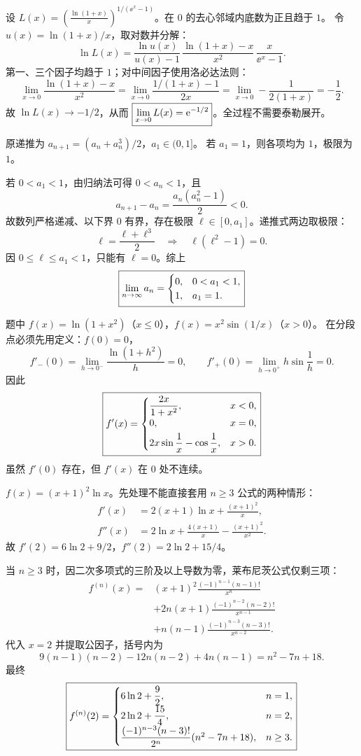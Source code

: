 \newpage
{}
设 $L(x)=\left(\frac{\ln(1+x)}x\right)^{1/(\ee^x-1)}$。在 $0$ 的去心邻域内底数为正且趋于 $1$。
令 $u(x)=\ln(1+x)/x$，取对数并分解：
\[
\ln L(x)=\frac{\ln u(x)}{u(x)-1}\,
\frac{\ln(1+x)-x}{x^2}\,
\frac{x}{\ee^x-1}.
\]
第一、三个因子均趋于 $1$；对中间因子使用洛必达法则：
\[
\lim_{x\to0}\frac{\ln(1+x)-x}{x^2}
=\lim_{x\to0}\frac{1/(1+x)-1}{2x}
=\lim_{x\to0}-\frac1{2(1+x)}=-\frac12.
\]
故 $\ln L(x)\to-1/2$，从而 $\boxed{\lim_{x\to0}L(x)=\mathrm e^{-1/2}}$。全过程不需要泰勒展开。

原递推为 $a_{n+1}=(a_n+a_n^3)/2$，$a_1\in(0,1]$。
若 $a_1=1$，则各项均为 $1$，极限为 $1$。

若 $0<a_1<1$，由归纳法可得 $0<a_n<1$，且
\[
a_{n+1}-a_n=\frac{a_n(a_n^2-1)}2<0.
\]
故数列严格递减、以下界 $0$ 有界，存在极限 $\ell\in[0,a_1]$。递推式两边取极限：
\[
\ell=\frac{\ell+\ell^3}2\quad\Longrightarrow\quad\ell(\ell^2-1)=0.
\]
因 $0\le\ell\le a_1<1$，只能有 $\ell=0$。综上
\[
\boxed{\lim_{n\to\infty}a_n=\begin{cases}0,&0<a_1<1,\\1,&a_1=1.\end{cases}}
\]

题中 $f(x)=\ln(1+x^2)$（$x\le0$），$f(x)=x^2\sin(1/x)$（$x>0$）。
在分段点必须先用定义：$f(0)=0$，
\[
f'_-(0)=\lim_{h\to0^-}\frac{\ln(1+h^2)}h=0,\qquad
f'_+(0)=\lim_{h\to0^+}h\sin\frac1h=0.
\]
因此
\[
\boxed{f'(x)=\begin{cases}
\dfrac{2x}{1+x^2},&x<0,\\[3pt]
0,&x=0,\\[3pt]
2x\sin\dfrac1x-\cos\dfrac1x,&x>0.
\end{cases}}
\]
虽然 $f'(0)$ 存在，但 $f'(x)$ 在 $0$ 处不连续。

\newpage
{}
$f(x)=(x+1)^2\ln x$。先处理不能直接套用 $n\ge3$ 公式的两种情形：
\begin{align*}
f'(x)&=2(x+1)\ln x+\frac{(x+1)^2}x,\\
f''(x)&=2\ln x+\frac{4(x+1)}x-\frac{(x+1)^2}{x^2}.
\end{align*}
故 $f'(2)=6\ln2+9/2$，$f''(2)=2\ln2+15/4$。

当 $n\ge3$ 时，因二次多项式的三阶及以上导数为零，莱布尼茨公式仅剩三项：
\begin{align*}
f^{(n)}(x)={}&(x+1)^2\frac{(-1)^{n-1}(n-1)!}{x^n}\\
&+2n(x+1)\frac{(-1)^{n-2}(n-2)!}{x^{n-1}}\\
&+n(n-1)\frac{(-1)^{n-3}(n-3)!}{x^{n-2}}.
\end{align*}
代入 $x=2$ 并提取公因子，括号内为
\[
9(n-1)(n-2)-12n(n-2)+4n(n-1)=n^2-7n+18.
\]
最终
\[
\boxed{f^{(n)}(2)=\begin{cases}
6\ln2+\dfrac92,&n=1,\\[3pt]
2\ln2+\dfrac{15}4,&n=2,\\[3pt]
\dfrac{(-1)^{n-3}(n-3)!}{2^n}(n^2-7n+18),&n\ge3.
\end{cases}}
\]

